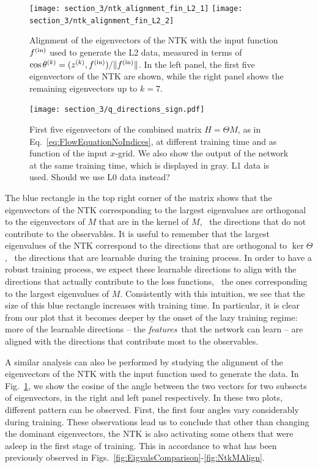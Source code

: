 \begin{figure}[ht!]
  \centering
  \texttt{[image: section\_3/ntk\_alignment\_fin\_L2\_1]}
  \texttt{[image: section\_3/ntk\_alignment\_fin\_L2\_2]}
  \caption{Alignment of the eigenvectors of the NTK with the input function
  $f^{\rm(in)}$ used to generate the L2 data, measured in terms of $\cos
  \theta^{(k)} = (z^{(k)}, f^{\rm{(in)}})/ \Vert f^{\rm{(in)}}\Vert$. In the
  left panel, the first five eigenvectors of the NTK are shown, while the right
  panel shows the remaining eigenvectors up to $k=7$.}
  \label{fig:NTKAlignFin}
\end{figure}
\begin{figure}[ht!]
  \centering
  \texttt{[image: section\_3/q\_directions\_sign.pdf]}
  \caption{First five eigenvectors of the combined matrix $H=\Theta M$, as in
  Eq.~\eqref{eq:FlowEquationNoIndices}, at different training time and as
  function of the input $x$-grid. We also show the output of the network at the
  same training time, which is displayed in gray. L1 data is used. \ac{Should we use L0
  data instead?}}
  \label{fig:NTKMEigVecs}
\end{figure}

The blue rectangle in the top right corner of the matrix shows that the
eigenvectors of the NTK corresponding to the largest eigenvalues are orthogonal
to the eigenvectors of $M$ that are in the kernel of $M$, \ie\ the directions
that do not contribute to the observables. It is useful to remember that the
largest eigenvalues of the NTK correspond to the directions that are orthogonal
to $\ker\Theta$, \ie\ the directions that are learnable during the training
process. In order to have a robust training process, we expect these learnable
directions to align with the directions that actually contribute to the loss
functions, \ie\ the ones corresponding to the largest eigenvalues of $M$.
Consistently with this intuition, we see that the size of this blue rectangle
increases with training time. In particular, it is clear from our plot that it
becomes deeper by the onset of the lazy training regime: more of the learnable
directions -- the {\it features}\ that the network can learn -- are aligned with
the directions that contribute most to the observables.

A similar analysis can also be performed by studying the alignment of the
eigenvectors of the NTK with the input function used to generate the data. In
Fig.~\ref{fig:NTKAlignFin}, we show the cosine of the angle between the two
vectors for two subsects of eigenvectors, in the right and left panel
respectively. In these two plots, different pattern can be observed. First, the
first four angles vary considerably during training. These observations lead us
to conclude that other than changing the dominant eigenvectors, the NTK is also
activating some others that were asleep in the first stage of training. This in
accordance to what has been previously observed in
Figs.~\ref{fig:EigvalsComparison}-\ref{fig:NtkMAlign}. 

